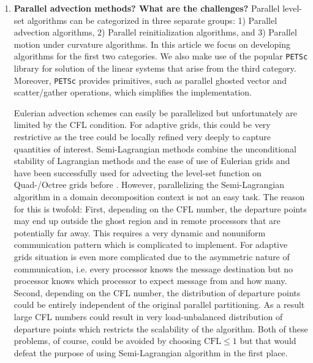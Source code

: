 \begin{enumerate}
\item \textbf{Parallel advection methods? What are the challenges?}
Parallel level-set algorithms can be categorized in three separate groups: 1) Parallel advection algorithms, 2) Parallel reinitialization algorithms, and 3) Parallel motion under curvature algorithms. In this article we focus on developing algorithms for the first two categories. We also make use of the popular \texttt{PETSc}  library for solution of the linear systems that arise from the third category. Moreover, \texttt{PETSc} provides primitives, such as parallel ghosted vector and scatter/gather operations, which simplifies the implementation. 

Eulerian advection schemes can easily be parallelized but unfortunately are limited by the CFL condition. For adaptive grids, this could be very restrictive as the tree could be locally refined very deeply to capture quantities of interest. Semi-Lagrangian methods combine the unconditional stability of Lagrangian methods and the ease of use of Eulerian grids and have been successfully used for advecting the level-set function on Quad-/Octree grids before \cite{Min;Gibou:07:A-second-order-accur}. However, parallelizing the Semi-Lagrangian algorithm in a domain decomposition context is not an easy task. The reason for this is twofold: First, depending on the CFL number, the departure points may end up outside the ghost region and in remote processors that are potentially far away. This requires a very dynamic and nonuniform communication pattern which is complicated to implement. For adaptive grids situation is even more complicated due to the asymmetric nature of communication, i.e. every processor knows the message destination but no processor knows which processor to expect message from and how many. Second, depending on the CFL number, the distribution of departure points could be entirely independent of the original parallel partitioning. As a result large CFL numbers could result in very load-unbalanced distribution of departure points which restricts the scalability of the algorithm. Both of these problems, of course, could be avoided by choosing $\text{CFL} \le 1$ but that would defeat the purpose of using Semi-Lagrangian algorithm in the first place. 


\end{enumerate}

